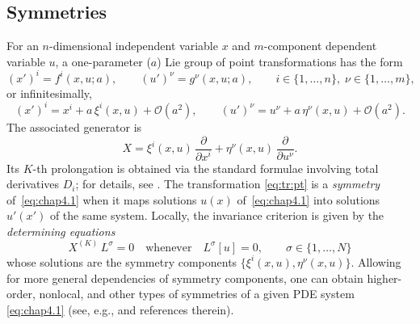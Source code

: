 \documentclass[alpha-refs, 12pt]{wiley-article}
\newcommand{\pd}[2]{\frac{\partial #1}{\partial #2}}
\begin{document}
\subsection{Symmetries}\label{ssec:symm}

For an $n$-dimensional independent variable $x$ and $m$-component dependent variable $u$, a one-parameter ($a$) Lie group of point transformations has the form
\begin{equation}\label{eq:tr:pt}
  (x')^{i}=f^{i}(x,u;a), \qquad
  (u')^{\nu}=g^{\nu}(x,u;a),
  \qquad
  i \in \{1,\dots,n\},\;
  \nu \in \{1,\dots,m\},
\end{equation}
or infinitesimally,
\[
  (x')^{i}=x^{i}+a\,\xi^{i}(x,u)+\mathcal{O}(a^{2}),\qquad
  (u')^{\nu}=u^{\nu}+a\,\eta^{\nu}(x,u)+\mathcal{O}(a^{2}).
\]
The associated generator is
\[
  X=\xi^{i}(x,u)\,\pd{}{x^{i}}+\eta^{\nu}(x,u)\,\pd{}{u^{\nu}}.
\]
Its $K$-th prolongation is obtained via the standard formulae involving total derivatives $D_{i}$; for details, see \cite{olver2000applications, Bluman2010, cheviakov2024analytical}. The transformation \eqref{eq:tr:pt} is a \emph{symmetry} of~\eqref{eq:chap4.1} when it maps solutions $u(x)$ of~\eqref{eq:chap4.1} into solutions $u'(x')$ of the same system. Locally, the invariance criterion is given by the \emph{determining equations}
\begin{equation}\label{eq:sym:det:eq}
  X^{(K)}\,L^{\sigma}=0
  \quad\text{whenever}\quad
  L^{\sigma}[u]=0,
  \qquad \sigma \in \{1,\dots,N\}
\end{equation}
whose solutions are the symmetry components $\{\xi^{i}(x,u), \eta^{\nu}(x,u)\}$. Allowing for more general dependencies of symmetry components, one can obtain higher-order, nonlocal, and other types of symmetries of a given PDE system \eqref{eq:chap4.1} (see, e.g., \citet{olver2000applications, Bluman2010, cheviakov2024analytical} and references therein).
\end{document}
